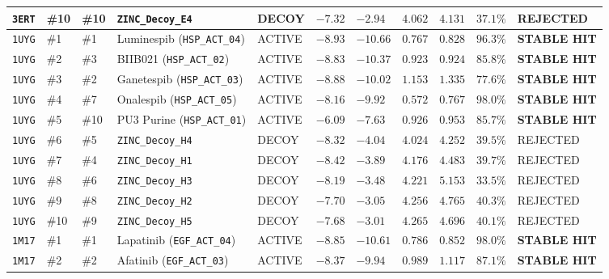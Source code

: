 \documentclass[11pt,a4paper]{article}
\begin{document}
{\begin{longtable}{L{0.8cm} C{0.65cm} C{0.65cm} L{2.6cm} C{1.3cm} R{0.95cm} R{0.95cm} R{1.0cm} R{0.9cm} R{0.95cm} C{1.85cm}}
\texttt{3ERT} & \#10 & \#10 & \texttt{ZINC\_Decoy\_E4} & DECOY & $-7.32$ & $-2.94$ & $4.062$ & $4.131$ & $37.1\%$ & \textcolor{failred}{REJECTED} \\
\midrule
\texttt{1UYG} & \#1 & \#1 & Luminespib (\texttt{HSP\_ACT\_04}) & ACTIVE & $-8.93$ & $-10.66$ & $0.767$ & $0.828$ & $96.3\%$ & \textcolor{passgreen}{\textbf{STABLE HIT}} \\
\texttt{1UYG} & \#2 & \#3 & BIIB021 (\texttt{HSP\_ACT\_02}) & ACTIVE & $-8.83$ & $-10.37$ & $0.923$ & $0.924$ & $85.8\%$ & \textcolor{passgreen}{\textbf{STABLE HIT}} \\
\texttt{1UYG} & \#3 & \#2 & Ganetespib (\texttt{HSP\_ACT\_03}) & ACTIVE & $-8.88$ & $-10.02$ & $1.153$ & $1.335$ & $77.6\%$ & \textcolor{passgreen}{\textbf{STABLE HIT}} \\
\texttt{1UYG} & \#4 & \#7 & Onalespib (\texttt{HSP\_ACT\_05}) & ACTIVE & $-8.16$ & $-9.92$ & $0.572$ & $0.767$ & $98.0\%$ & \textcolor{passgreen}{\textbf{STABLE HIT}} \\
\texttt{1UYG} & \#5 & \#10 & PU3 Purine (\texttt{HSP\_ACT\_01}) & ACTIVE & $-6.09$ & $-7.63$ & $0.926$ & $0.953$ & $85.7\%$ & \textcolor{passgreen}{\textbf{STABLE HIT}} \\
\texttt{1UYG} & \#6 & \#5 & \texttt{ZINC\_Decoy\_H4} & DECOY & $-8.32$ & $-4.04$ & $4.024$ & $4.252$ & $39.5\%$ & \textcolor{failred}{REJECTED} \\
\texttt{1UYG} & \#7 & \#4 & \texttt{ZINC\_Decoy\_H1} & DECOY & $-8.42$ & $-3.89$ & $4.176$ & $4.483$ & $39.7\%$ & \textcolor{failred}{REJECTED} \\
\texttt{1UYG} & \#8 & \#6 & \texttt{ZINC\_Decoy\_H3} & DECOY & $-8.19$ & $-3.48$ & $4.221$ & $5.153$ & $33.5\%$ & \textcolor{failred}{REJECTED} \\
\texttt{1UYG} & \#9 & \#8 & \texttt{ZINC\_Decoy\_H2} & DECOY & $-7.70$ & $-3.05$ & $4.256$ & $4.765$ & $40.3\%$ & \textcolor{failred}{REJECTED} \\
\texttt{1UYG} & \#10 & \#9 & \texttt{ZINC\_Decoy\_H5} & DECOY & $-7.68$ & $-3.01$ & $4.265$ & $4.696$ & $40.1\%$ & \textcolor{failred}{REJECTED} \\
\midrule
\texttt{1M17} & \#1 & \#1 & Lapatinib (\texttt{EGF\_ACT\_04}) & ACTIVE & $-8.85$ & $-10.61$ & $0.786$ & $0.852$ & $98.0\%$ & \textcolor{passgreen}{\textbf{STABLE HIT}} \\
\texttt{1M17} & \#2 & \#2 & Afatinib (\texttt{EGF\_ACT\_03}) & ACTIVE & $-8.37$ & $-9.94$ & $0.989$ & $1.117$ & $87.1\%$ & \textcolor{passgreen}{\textbf{STABLE HIT}} \\

\end{longtable}}
\end{document}
